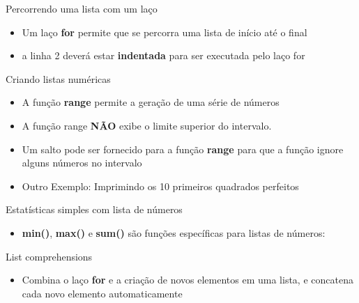 
\begin{frame}[t, fragile]{Percorrendo uma lista com um laço}
  \begin{itemize}
    \item Um laço {\bf for} permite que se percorra uma lista de início até o final
    
    \item a linha 2 deverá estar {\bf indentada} para ser executada pelo laço for
  \end{itemize}
\end{frame}
%
\begin{frame}{Criando listas numéricas}
  \begin{itemize}
    \item A função {\bf range} permite a geração de uma série de números
    
     \item A  função range {\bf NÃO} exibe o limite superior do intervalo.
     \item Um salto pode ser fornecido para a função {\bf range} para que a função ignore alguns números no intervalo
    
\pagebreak
    \item Outro Exemplo: Imprimindo os 10 primeiros quadrados perfeitos
    
  \end{itemize}
\end{frame}
%
\begin{frame}{Estatísticas simples com lista de números}
  \begin{itemize}
    \item {\bf min()}, {\bf max()} e {\bf sum()} são funções específicas para listas de números:
    
  \end{itemize}
\end{frame}
%
\begin{frame}[t, fragile]{List comprehensions}
  \begin{itemize}
    \item Combina o laço {\bf for} e a criação de novos elementos em uma lista, e concatena cada novo elemento automaticamente
    
  \end{itemize}
\end{frame}
%

